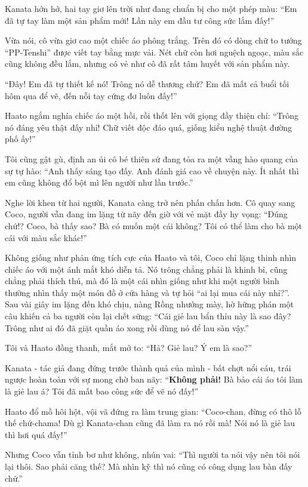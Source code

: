\documentclass[../main.tex]{subfiles}
\begin{document}
Kanata hớn hở, hai tay giơ lên trời như đang chuẩn bị cho một phép màu: ``Em đã tự tay làm một sản phẩm mới! Lần này em đầu tư công sức lắm đấy!''

Vừa nói, cô vừa giơ cao một chiếc áo phông trắng. Trên đó có dòng chữ to tướng ``PP-Tenshi'' được viết tay bằng mực vải. Nét chữ còn hơi nguệch ngoạc, màu sắc cũng không đều lắm, nhưng có vẻ như cô đã rất tâm huyết với sản phẩm này.


``Đây! Em đã tự thiết kế nó! Trông nó dễ thương chứ? Em đã mất cả buổi tối hôm qua để vẽ, đến nỗi tay cứng đơ luôn đấy!''

Haato ngắm nghía chiếc áo một hồi, rồi thốt lên với giọng đầy thiện chí: ``Trông nó đáng yêu thật đấy nhỉ! Chữ viết độc đáo quá, giống kiểu nghệ thuật đường phố ấy!''

Tôi cũng gật gù, định an ủi cô bé thiên sứ đang tỏa ra một vầng hào quang của sự tự hào: ``Anh thấy sáng tạo đấy. Anh đánh giá cao về chuyện này. Ít nhất thì em cũng không đổ bột mì lên người như lần trước.''

Nghe lời khen từ hai người, Kanata càng trở nên phấn chấn hơn. Cô quay sang Coco, người vẫn đang im lặng từ nãy đến giờ với vẻ mặt đầy hy vọng: ``Đúng chứ!? Coco, bà thấy sao? Bà có muốn một cái không? Tôi có thể làm cho bà một cái với màu sắc khác!''

Không giống như phản ứng tích cực của Haato và tôi, Coco chỉ lặng thinh nhìn chiếc áo với một ánh mắt khó diễn tả. Nó trông chẳng phải là khinh bỉ, cũng chẳng phải thích thú, mà đó là một cái nhìn giống như khi một người bình thường nhìn thấy một món đồ ở cửa hàng và tự hỏi ``ai lại mua cái này nhỉ?''. Sau vài giây im lặng đến khó chịu, nàng Rồng nhướng mày, hờ hững phán một câu khiến cả ba người còn lại chết sững: ``Cái giẻ lau bẩn thỉu này là sao đây? Trông như ai đó đã giặt quần áo xong rồi dùng nó để lau sàn vậy.''

Tôi và Haato đồng thanh, mắt mở to: ``Hả? Giẻ lau? Ý em là sao?''

Kanata - tác giả đang đứng trước thành quả của mình - bất chợt nổi cáu, trái ngược hoàn toàn với sự mong chờ ban nãy: ``\textbf{Không phải!} Bà bảo cái áo tôi làm là giẻ lau á? Tôi đã mất bao công sức để vẽ nó đấy!''

Haato đổ mồ hôi hột, vội vã đứng ra làm trung gian: ``Coco-chan, đừng có thô lỗ thế chứ-chama! Dù gì Kanata-chan cũng đã làm ra nó rồi mà! Nói nó là giẻ lau thì hơi quá đấy!''

Nhưng Coco vẫn tỉnh bơ như không, nhún vai: ``Thì người ta nói vậy nên tôi nói lại thôi. Sao phải căng thế? Mà nhìn kỹ thì nó cũng có công dụng lau bàn đấy chứ.''
\end{document}
